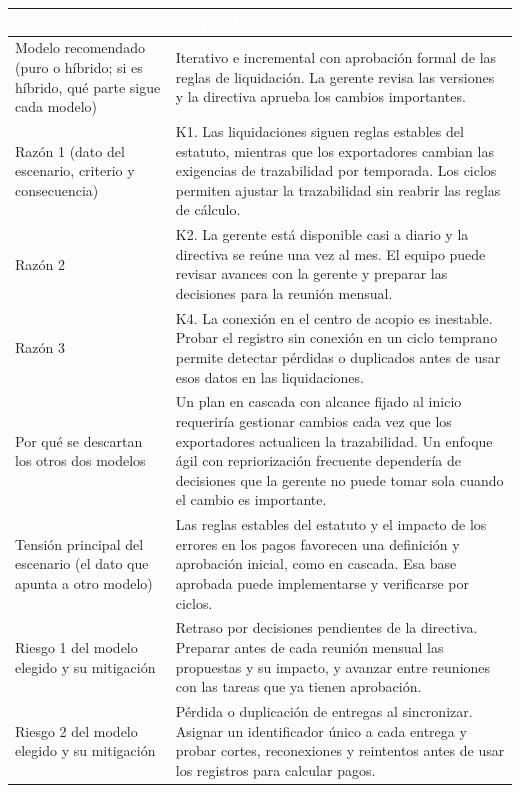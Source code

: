 \begin{center}
\small
\begin{tabularx}{\textwidth}{|>{\raggedright\arraybackslash}p{4.5cm}|L|}
\hline
{}
\textcolor{white}{\textbf{Elemento}}
& \textcolor{white}{\textbf{Respuesta}} \\ \hline
Modelo recomendado (puro o híbrido; si es híbrido, qué parte sigue cada modelo)
& Iterativo e incremental con aprobación formal de las reglas de liquidación. La gerente revisa las versiones y la directiva aprueba los cambios importantes.
\\ \hline
Razón 1 (dato del escenario, criterio y consecuencia)
& K1. Las liquidaciones siguen reglas estables del estatuto, mientras que los exportadores cambian las exigencias de trazabilidad por temporada. Los ciclos permiten ajustar la trazabilidad sin reabrir las reglas de cálculo.
\\ \hline
Razón 2
& K2. La gerente está disponible casi a diario y la directiva se reúne una vez al mes. El equipo puede revisar avances con la gerente y preparar las decisiones para la reunión mensual.
\\ \hline
Razón 3
& K4. La conexión en el centro de acopio es inestable. Probar el registro sin conexión en un ciclo temprano permite detectar pérdidas o duplicados antes de usar esos datos en las liquidaciones.
\\ \hline
Por qué se descartan los otros dos modelos
& Un plan en cascada con alcance fijado al inicio requeriría gestionar cambios cada vez que los exportadores actualicen la trazabilidad. Un enfoque ágil con repriorización frecuente dependería de decisiones que la gerente no puede tomar sola cuando el cambio es importante.
\\ \hline
Tensión principal del escenario (el dato que apunta a otro modelo)
& Las reglas estables del estatuto y el impacto de los errores en los pagos favorecen una definición y aprobación inicial, como en cascada. Esa base aprobada puede implementarse y verificarse por ciclos.
\\ \hline
Riesgo 1 del modelo elegido y su mitigación
& Retraso por decisiones pendientes de la directiva. Preparar antes de cada reunión mensual las propuestas y su impacto, y avanzar entre reuniones con las tareas que ya tienen aprobación.
\\ \hline
Riesgo 2 del modelo elegido y su mitigación
& Pérdida o duplicación de entregas al sincronizar. Asignar un identificador único a cada entrega y probar cortes, reconexiones y reintentos antes de usar los registros para calcular pagos.
\\ \hline
\end{tabularx}
\end{center}